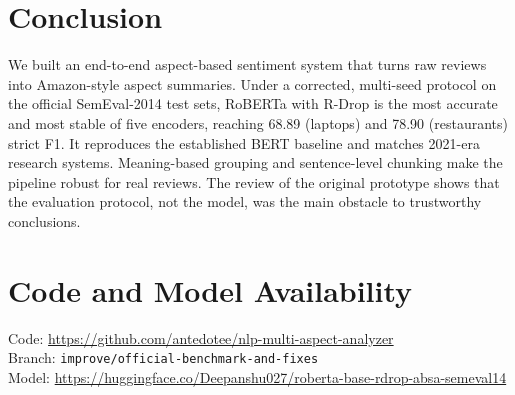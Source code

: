 \documentclass[conference]{IEEEtran}
\begin{document}
\section{Conclusion}
We built an end-to-end aspect-based sentiment system that turns raw reviews into Amazon-style aspect summaries. Under a corrected, multi-seed protocol on the official SemEval-2014 test sets, RoBERTa with R-Drop is the most accurate and most stable of five encoders, reaching 68.89 (laptops) and 78.90 (restaurants) strict F1. It reproduces the established BERT baseline and matches 2021-era research systems. Meaning-based grouping and sentence-level chunking make the pipeline robust for real reviews. The review of the original prototype shows that the evaluation protocol, not the model, was the main obstacle to trustworthy conclusions.

\section*{Code and Model Availability}
{\raggedright\small
Code: \url{https://github.com/antedotee/nlp-multi-aspect-analyzer}\\
Branch: \texttt{improve/official-benchmark-and-fixes}\\
Model: \url{https://huggingface.co/Deepanshu027/roberta-base-rdrop-absa-semeval14}\par}
\end{document}

